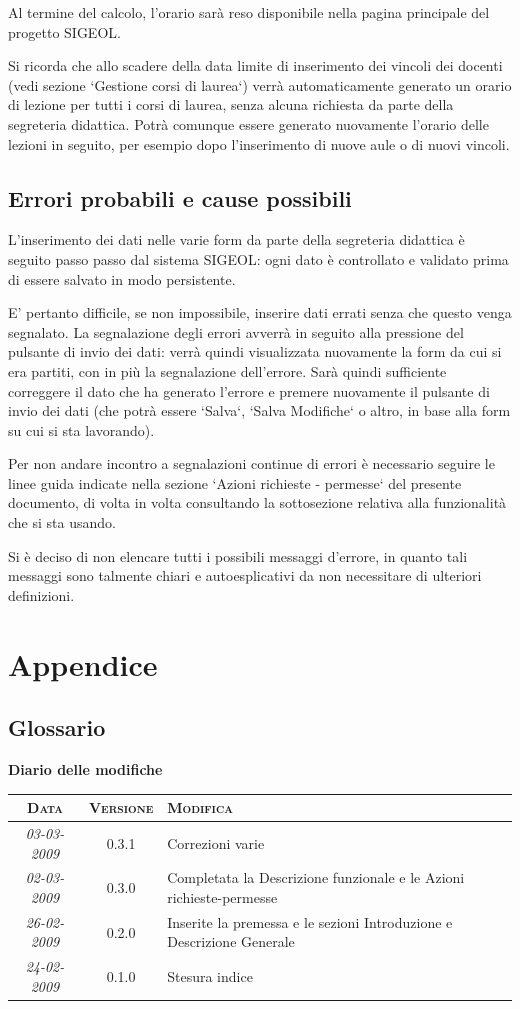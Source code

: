 \documentclass[11pt,a4paper]{article}
\newcommand{\modifiche} 
{
\newpage
\begin{center}
\textbf{Diario delle modifiche} \\
\bigskip
\begin{tabular}{|c|c|p{0.62\textwidth}|}
\hline
\textsc{Data} & \textsc{Versione} & \textsc{Modifica} \\
\hline
\hline
\textit{03-03-2009} & 0.3.1 & Correzioni varie\\
\hline
\textit{02-03-2009} & 0.3.0 & Completata la Descrizione funzionale e le Azioni richieste-permesse\\
\hline
\textit{26-02-2009} & 0.2.0 & Inserite la premessa e le sezioni Introduzione e Descrizione Generale\\
\hline
\textit{24-02-2009} & 0.1.0 & Stesura indice\\
\hline
\end{tabular}
\end{center}
}
\begin{document}
Al termine del calcolo, l'orario sarà reso disponibile nella pagina principale del progetto SIGEOL.

Si ricorda che allo scadere della data limite di inserimento dei vincoli dei docenti (vedi sezione `Gestione corsi di laurea`) verrà automaticamente generato un orario di lezione per tutti i corsi di laurea, senza alcuna richiesta da parte della segreteria didattica. Potrà comunque essere generato nuovamente l'orario delle lezioni in seguito, per esempio dopo l'inserimento di nuove aule o di nuovi vincoli.
\subsection{Errori probabili e cause possibili}
L'inserimento dei dati nelle varie form da parte della segreteria didattica è seguito passo passo dal sistema SIGEOL: ogni dato è controllato e validato prima di essere salvato in modo persistente.

E' pertanto difficile, se non impossibile, inserire dati errati senza che questo venga segnalato.
La segnalazione degli errori avverrà in seguito alla pressione del pulsante di invio dei dati: verrà quindi visualizzata nuovamente la form da cui si era partiti, con in più la segnalazione dell'errore. Sarà quindi sufficiente correggere il dato che ha generato l'errore e premere nuovamente il pulsante di invio dei dati (che potrà essere `Salva`, `Salva Modifiche` o altro, in base alla form su cui si sta lavorando).

Per non andare incontro a segnalazioni continue di errori è necessario seguire le linee guida indicate nella sezione `Azioni richieste - permesse` del presente documento, di volta in volta consultando la sottosezione relativa alla funzionalità che si sta usando.

Si è deciso di non elencare tutti i possibili messaggi d'errore, in quanto tali messaggi sono talmente chiari e autoesplicativi da non necessitare di ulteriori definizioni.
\newpage
\section{Appendice}
\subsection{Glossario}




\modifiche
\end{document}
